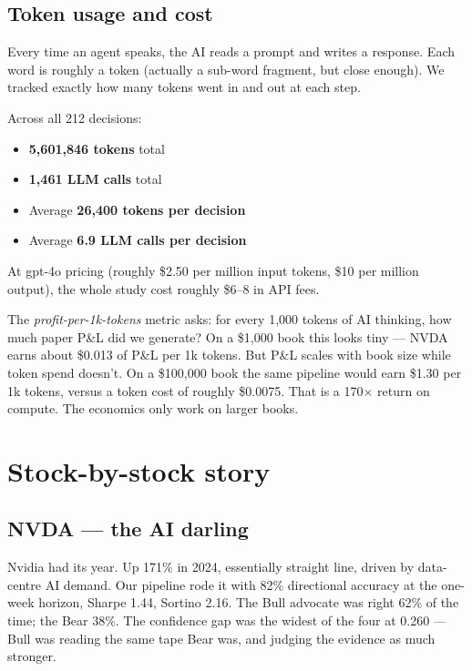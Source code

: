 \documentclass[11pt,a4paper]{article}
\begin{document}
\subsection*{Token usage and cost}

Every time an agent speaks, the AI reads a prompt and writes a response.
Each word is roughly a token (actually a sub-word fragment, but close
enough). We tracked exactly how many tokens went in and out at each step.

Across all 212 decisions:

\begin{itemize}
\item \textbf{5{,}601{,}846 tokens} total
\item \textbf{1{,}461 LLM calls} total
\item Average \textbf{26{,}400 tokens per decision}
\item Average \textbf{6.9 LLM calls per decision}
\end{itemize}

At gpt-4o pricing (roughly \$2.50 per million input tokens, \$10 per
million output), the whole study cost roughly \$6--8 in API fees.

The \textit{profit-per-1k-tokens} metric asks: for every 1{,}000 tokens
of AI thinking, how much paper P\&L did we generate? On a \$1{,}000 book
this looks tiny --- NVDA earns about \$0.013 of P\&L per 1k tokens. But
P\&L scales with book size while token spend doesn't. On a \$100{,}000
book the same pipeline would earn \$1.30 per 1k tokens, versus a token
cost of roughly \$0.0075. That is a 170$\times$ return on compute. The
economics only work on larger books.

\section{Stock-by-stock story}

\subsection*{NVDA --- the AI darling}

Nvidia had its year. Up 171\% in 2024, essentially straight line, driven
by data-centre AI demand. Our pipeline rode it with 82\% directional
accuracy at the one-week horizon, Sharpe 1.44, Sortino 2.16. The Bull
advocate was right 62\% of the time; the Bear 38\%. The confidence gap
was the widest of the four at 0.260 --- Bull was reading the same tape
Bear was, and judging the evidence as much stronger.
\end{document}

